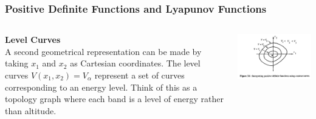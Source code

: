 \documentclass[11pt,handout]{beamer}   %
\begin{document}
\begin{frame}
\frametitle{Positive Definite Functions and Lyapunov Functions}
\begin{columns}
\begin{column}{0.5\textwidth}
\textbf{Level Curves}\\
A second geometrical representation can be made by taking $x_1$ and $x_2$ as Cartesian coordinates. The level curves $V(x_1,x_2) = V_\alpha$ represent a set of curves corresponding to an energy level. Think of this as a topology graph where each band is a level of energy rather than altitude.
\end{column}
\begin{column}{0.5\textwidth}
\begin{center}
\includegraphics[width = \textwidth]{Figures/Fig38.PNG}
\end{center}
\end{column}
\end{columns}
\end{frame}
\end{document}
